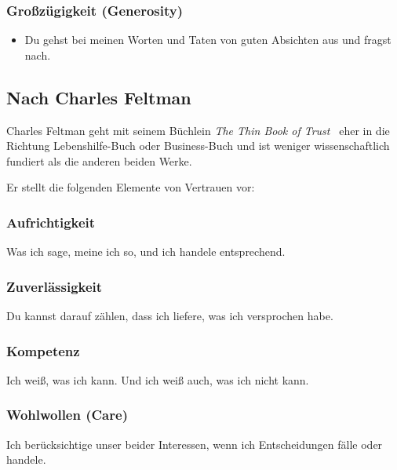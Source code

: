 \subsubsection{Großzügigkeit (Generosity)}

\begin{itemize}
  \item \glqq Du gehst bei meinen Worten und Taten von guten Absichten aus und fragst nach.\grqq
\end{itemize}


\subsection{Nach Charles Feltman}

Charles Feltman geht mit seinem Büchlein \emph{The Thin Book of Trust}~\cite{thin-book-of-trust} eher in die Richtung Lebenshilfe-Buch oder Business-Buch und ist weniger wissenschaftlich fundiert als die anderen beiden Werke.

Er stellt die folgenden Elemente von Vertrauen vor:


\subsubsection{Aufrichtigkeit}

\glqq Was ich sage, meine ich so, und ich handele entsprechend.\grqq


\subsubsection{Zuverlässigkeit}

\glqq Du kannst darauf zählen, dass ich liefere, was ich versprochen habe.\grqq


\subsubsection{Kompetenz}

\glqq Ich weiß, was ich kann. Und ich weiß auch, was ich nicht kann.\grqq


\subsubsection{Wohlwollen (Care)}

\glqq Ich berücksichtige unser beider Interessen, wenn ich Entscheidungen fälle oder handele.\grqq


